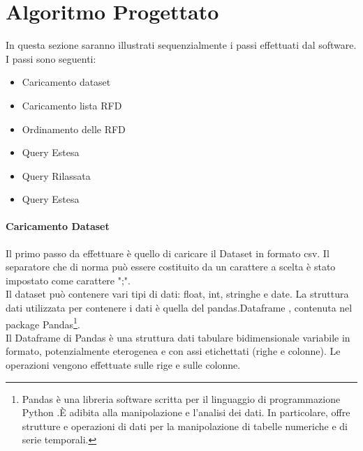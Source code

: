 \section{Algoritmo Progettato}
In questa sezione saranno illustrati sequenzialmente i passi effettuati dal software. I passi sono  seguenti:
\begin{itemize}[noitemsep]
    \item Caricamento dataset
    \item Caricamento lista RFD
    \item Ordinamento delle RFD
    \item Query Estesa
    \item Query Rilassata
    \item Query Estesa
\end{itemize}
\paragraph{Caricamento Dataset}
Il primo passo da effettuare è quello di caricare il Dataset in formato csv. Il separatore che di norma può essere costituito da un carattere a scelta è stato impostato come carattere ";".\\ Il dataset può contenere vari tipi di dati: float, int, stringhe e date.
La struttura dati utilizzata per contenere i dati è quella del pandas.Dataframe , contenuta nel package Pandas\footnote{Pandas è una libreria software scritta per il linguaggio di programmazione Python .È adibita alla manipolazione e l'analisi dei dati. In particolare, offre strutture e operazioni di dati per la manipolazione di tabelle numeriche e di serie temporali. }. \\Il Dataframe di Pandas è una struttura dati tabulare bidimensionale variabile in formato, potenzialmente eterogenea e con assi etichettati (righe e colonne). Le operazioni vengono effettuate sulle rige e sulle colonne. 
